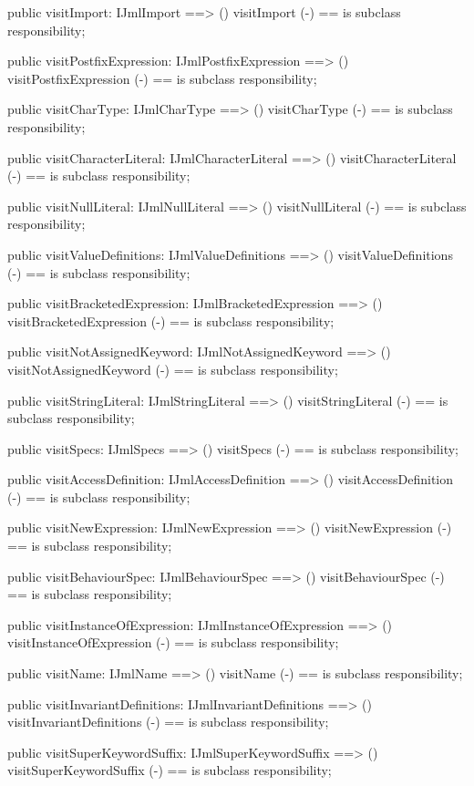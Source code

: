 \begin{vdm_al}
  public visitImport: IJmlImport ==> ()
  visitImport (-) == is subclass responsibility;

  public visitPostfixExpression: IJmlPostfixExpression ==> ()
  visitPostfixExpression (-) == is subclass responsibility;

  public visitCharType: IJmlCharType ==> ()
  visitCharType (-) == is subclass responsibility;

  public visitCharacterLiteral: IJmlCharacterLiteral ==> ()
  visitCharacterLiteral (-) == is subclass responsibility;

  public visitNullLiteral: IJmlNullLiteral ==> ()
  visitNullLiteral (-) == is subclass responsibility;

  public visitValueDefinitions: IJmlValueDefinitions ==> ()
  visitValueDefinitions (-) == is subclass responsibility;

  public visitBracketedExpression: IJmlBracketedExpression ==> ()
  visitBracketedExpression (-) == is subclass responsibility;

  public visitNotAssignedKeyword: IJmlNotAssignedKeyword ==> ()
  visitNotAssignedKeyword (-) == is subclass responsibility;

  public visitStringLiteral: IJmlStringLiteral ==> ()
  visitStringLiteral (-) == is subclass responsibility;

  public visitSpecs: IJmlSpecs ==> ()
  visitSpecs (-) == is subclass responsibility;

  public visitAccessDefinition: IJmlAccessDefinition ==> ()
  visitAccessDefinition (-) == is subclass responsibility;

  public visitNewExpression: IJmlNewExpression ==> ()
  visitNewExpression (-) == is subclass responsibility;

  public visitBehaviourSpec: IJmlBehaviourSpec ==> ()
  visitBehaviourSpec (-) == is subclass responsibility;

  public visitInstanceOfExpression: IJmlInstanceOfExpression ==> ()
  visitInstanceOfExpression (-) == is subclass responsibility;

  public visitName: IJmlName ==> ()
  visitName (-) == is subclass responsibility;

  public visitInvariantDefinitions: IJmlInvariantDefinitions ==> ()
  visitInvariantDefinitions (-) == is subclass responsibility;

  public visitSuperKeywordSuffix: IJmlSuperKeywordSuffix ==> ()
  visitSuperKeywordSuffix (-) == is subclass responsibility;


\end{vdm_al}
